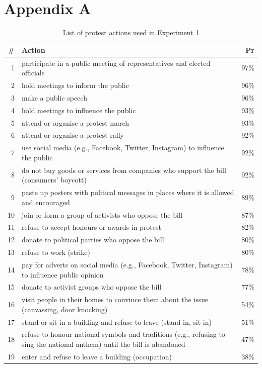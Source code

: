 \documentclass[12pt, letterpaper]{article}
\begin{document}
\begin{table}

\section{Appendix A}

\caption{List of protest actions used in Experiment 1}
\small
\begin{tabularx}{\linewidth}{rXr}
\addlinespace
\toprule
\# & Action & Pr\\
\midrule
1 & participate in a public meeting of representatives and elected officials & 97\%\\
2 & hold meetings to inform the public & 96\%\\
3 & make a public speech & 96\%\\
4 & hold meetings to influence the public & 93\%\\
5 & attend or organise a protest march & 93\%\\
6 & attend or organise a protest rally & 92\%\\
7 & use social media (e.g., Facebook, Twitter, Instagram) to influence the public & 92\%\\
8 & do not buy goods or services from companies who support the bill (consumers' boycott) & 92\%\\
9 & paste up posters with political messages in places where it is allowed and encouraged & 89\%\\
10 & join or form a group of activists who oppose the bill & 87\%\\
11 & refuse to accept honours or awards in protest & 82\%\\
12 & donate to political parties who oppose the bill & 80\%\\
13 & refuse to work (strike) & 80\%\\
14 & pay for adverts on social media (e.g., Facebook, Twitter, Instagram) to influence public opinion & 78\%\\
15 & donate to activist groups who oppose the bill & 77\%\\
16 & visit people in their homes to convince them about the issue (canvassing, door knocking) & 54\%\\
17 & stand or sit in a building and refuse to leave (stand-in, sit-in) & 51\%\\
18 & refuse to honour national symbols and traditions (e.g., refusing to sing the national anthem) until the bill is abandoned & 47\%\\
19 & enter and refuse to leave a building (occupation) & 38\%\\

\end{tabularx}
\end{table}
\end{document}
